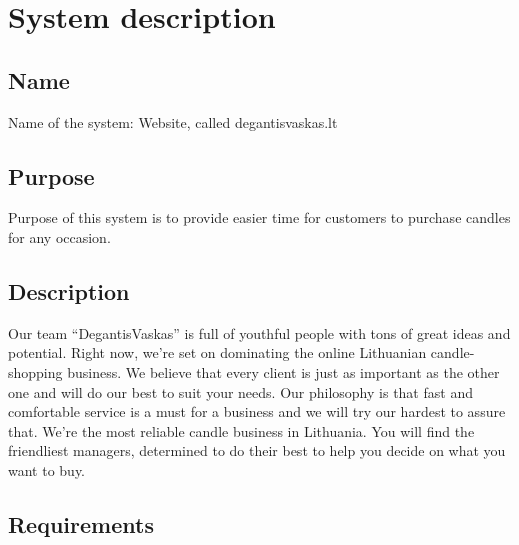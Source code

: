 \documentclass[a4paper,12pt,fleqn]{article}
\begin{document}

\tableofcontents


\newpage
\section{System description}
\label{sec:motivation}
\subsection{Name}
\label{sec:example}
Name of the system: Website, called degantisvaskas.lt
\subsection{Purpose}
\label{sec:example}
Purpose of this system is to provide easier time for customers to purchase candles for any occasion.
\subsection{Description}
\label{sec:example}
Our team “DegantisVaskas” is full of youthful people with tons of great ideas and potential. Right now, we’re set on dominating the online Lithuanian candle-shopping business. We believe that every client is just as important as the other one and will do our best to suit your needs. Our philosophy is that fast and comfortable service is a must for a business and we will try our hardest to assure that. We’re the most reliable candle business in Lithuania. You will find the friendliest managers, determined to do their best to help you decide on what you want to buy.
\subsection{Requirements}
\label{sec:example}
\begin{description}[font=$\bullet$~\normalfont\scshape\color{red!50!black}]
\item [MySQL] 
\item [Apache] 
\item [HTML]
\item [PHP]
\item [CSS]
\end{description}
\end{document}
